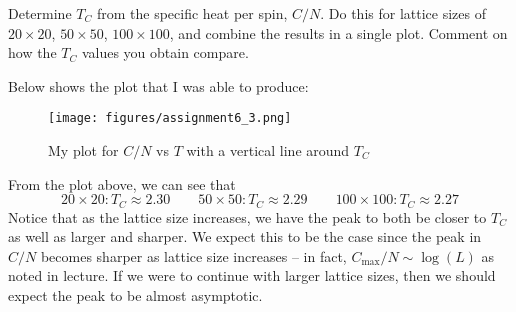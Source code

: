 \begin{qBox}{3}
Determine \( T_{ C } \) from the specific heat per spin, \( C / N \).
Do this for lattice sizes of \( 20 \times 20 \), \( 50 \times 50 \), 
\( 100 \times 100 \), and combine the results in a single plot.
Comment on how the \( T_{ C } \) values you obtain compare.

\tcblower

Below shows the plot that I was able to produce: 

\begin{figure}[H]
    \centering
    \texttt{[image: figures/assignment6\_3.png]}
    \caption{My plot for \( C / N \) vs \( T \) with a vertical line around %
    \( T_{ C } \)}
\end{figure}

From the plot above, we can see that 
\begin{equation*}
    20 \times 20: 
    T_{ C } \approx 2.30
    \qquad 
    50 \times 50: 
    T_{ C } \approx 2.29
    \qquad 
    100 \times 100: 
    T_{ C } \approx 2.27
\end{equation*}
Notice that as the lattice size increases, we have the peak to both be closer to 
\( T_{ C } \) as well as larger and sharper.
We expect this to be the case since the peak in \( C / N \) becomes 
sharper as lattice size increases -- in fact, \( C_{ \text{max} } / N \sim \log ( L ) \)
as noted in lecture.
If we were to continue with larger lattice sizes, then we should expect the peak 
to be almost asymptotic. 
\end{qBox}